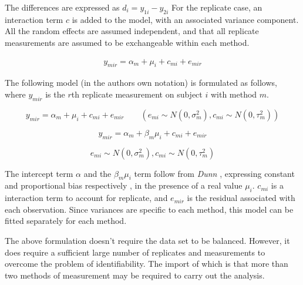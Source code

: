 \documentclass[12pt, a4paper]{report}
\theoremstyle{plain}
\theoremstyle{definition}
\theoremstyle{remark}
\begin{document}
	
	
	
	The differences are expressed as $d_{i} = y_{1i} - y_{2i}$ For the
	replicate case, an interaction term $c$ is added to the model,
	with an associated variance component. 
	All the random effects are
	assumed independent, and that all replicate measurements are
	assumed to be exchangeable within each method.
	
	\begin{eqnarray}
	y_{mir}  = \alpha_{m} + \mu_{i} + c_{mi} + e_{mir} 
	\end{eqnarray}
	
	
	
	The following model (in the authors own notation) is
	formulated as follows, where $y_{mir}$ is the $r$th replicate
	measurement on subject $i$ with method $m$.
	
	{
		
		\begin{equation}
		y_{mir}  = \alpha_{m} + \mu_{i} + c_{mi} + e_{mir} \qquad ( e_{mi}
		\sim N(0,\sigma^{2}_{m}), c_{mi} \sim N(0,\tau^{2}_{m}))
		\end{equation}
		
		
		\begin{equation}
		y_{mir}  = \alpha_{m} + \beta_{m}\mu_{i} + c_{mi} + e_{mir} 
		\end{equation}
	}
	
	{
		
		\[ e_{mi} \sim N(0,\sigma^{2}_{m}), c_{mi} \sim N(0,\tau^{2}_{m})\]
	}
	
	
	The intercept term $\alpha$ and the $\beta_{m}\mu_{i}$ term follow
	from \textit{Dunn} \cite{DunnSEME}, expressing constant and proportional bias
	respectively , in the presence of a real value $\mu_{i}.$
	$c_{mi}$ is a interaction term to account for replicate, and
	$e_{mir}$ is the residual associated with each observation.
	Since variances are specific to each method, this model can be
	fitted separately for each method.
	
	
	
	
	The above formulation doesn't require the data set to be balanced.
	However, it does require a sufficient large number of replicates
	and measurements to overcome the problem of identifiability. 
	The
	import of which is that more than two methods of measurement may
	be required to carry out the analysis. 
	
\end{document}
